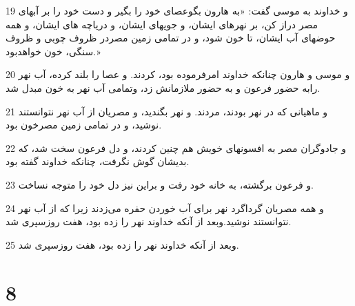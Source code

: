 \par 19 و خداوند به موسی گفت: «به هارون بگوعصای خود را بگیر و دست خود را بر آبهای مصر دراز کن، بر نهرهای ایشان، و جویهای ایشان، و دریاچه های ایشان، و همه حوضهای آب ایشان، تا خون شود، و در تمامی زمین مصردر ظروف چوبی و ظروف سنگی، خون خواهدبود.» 
\par 20 و موسی و هارون چنانکه خداوند امرفرموده بود، کردند. و عصا را بلند کرده، آب نهر رابه حضور فرعون و به حضور ملازمانش زد، وتمامی آب نهر به خون مبدل شد.
\par 21 و ماهیانی که در نهر بودند، مردند. و نهر بگندید، و مصریان از آب نهر نتوانستند نوشید، و در تمامی زمین مصرخون بود.
\par 22 و جادوگران مصر به افسونهای خویش هم چنین کردند، و دل فرعون سخت شد، که بدیشان گوش نگرفت، چنانکه خداوند گفته بود.
\par 23 و فرعون برگشته، به خانه خود رفت و براین نیز دل خود را متوجه نساخت.
\par 24 و همه مصریان گرداگرد نهر برای آب خوردن حفره می‌زدند زیرا که از آب نهر نتوانستند نوشید.وبعد از آنکه خداوند نهر را زده بود، هفت روزسپری شد.
\par 25 وبعد از آنکه خداوند نهر را زده بود، هفت روزسپری شد.
 
\chapter{8}

